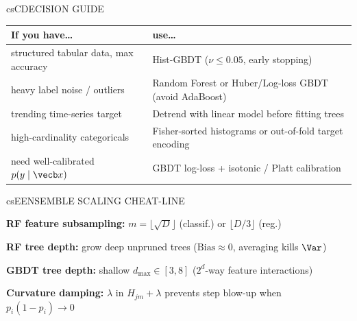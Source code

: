 \documentclass[../../../../master.tex]{subfiles}
\begin{document}
\begin{cscolumns}
\begin{cscard}{csC}{DECISION GUIDE}
  \renewcommand{\arraystretch}{1.22}\small
  \begin{tabular}{@{}>{\raggedright\arraybackslash}p{3.2cm}>{\raggedright\arraybackslash}p{4.6cm}@{}}
    \textbf{If you have\ldots} & \textbf{use\ldots}\\ \hline
    structured tabular data, max accuracy & Hist-GBDT ($\nu\le 0.05$, early stopping)\\
    heavy label noise / outliers & Random Forest or Huber/Log-loss GBDT (avoid AdaBoost)\\
    trending time-series target & Detrend with linear model before fitting trees\\
    high-cardinality categoricals & Fisher-sorted histograms or out-of-fold target encoding\\
    need well-calibrated $p(y\mid\vecb x)$ & GBDT log-loss + isotonic / Platt calibration\\
  \end{tabular}
\end{cscard}

\begin{cscard}{csE}{ENSEMBLE SCALING CHEAT-LINE}
  \begin{csbul}
    \item \textbf{RF feature subsampling:} $m=\lfloor\sqrt D\rfloor$ (classif.) or $\lfloor D/3\rfloor$ (reg.)
    \item \textbf{RF tree depth:} grow deep unpruned trees ($\mathrm{Bias}\approx 0$, averaging kills $\Var$)
    \item \textbf{GBDT tree depth:} shallow $d_{\max}\in[3,8]$ ($2^d$-way feature interactions)
    \item \textbf{Curvature damping:} $\lambda$ in $H_{jm}+\lambda$ prevents step blow-up when $p_i(1-p_i)\to 0$
  \end{csbul}
\end{cscard}


\end{cscolumns}
\end{document}
